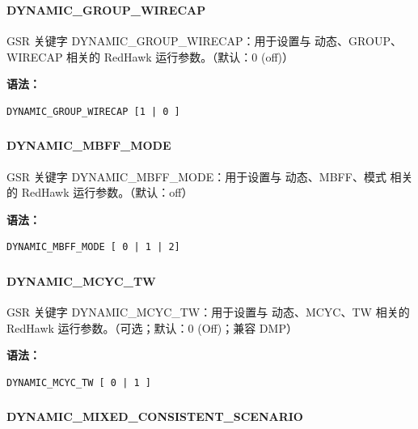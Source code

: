 \subsubsection{}
\paragraph*{DYNAMIC_GROUP_WIRECAP}

GSR 关键字 DYNAMIC_GROUP_WIRECAP：用于设置与 动态、GROUP、WIRECAP 相关的 RedHawk 运行参数。（默认：0 (off)）

\textbf{语法：}
\begin{lstlisting}
DYNAMIC_GROUP_WIRECAP [1 | 0 ]
\end{lstlisting}

\subsubsection{}
\paragraph*{DYNAMIC_MBFF_MODE}

GSR 关键字 DYNAMIC_MBFF_MODE：用于设置与 动态、MBFF、模式 相关的 RedHawk 运行参数。（默认：off）

\textbf{语法：}
\begin{lstlisting}
DYNAMIC_MBFF_MODE [ 0 | 1 | 2]
\end{lstlisting}

\subsubsection{}
\paragraph*{DYNAMIC_MCYC_TW}

GSR 关键字 DYNAMIC_MCYC_TW：用于设置与 动态、MCYC、TW 相关的 RedHawk 运行参数。（可选；默认：0 (Off)；兼容 DMP）

\textbf{语法：}
\begin{lstlisting}
DYNAMIC_MCYC_TW [ 0 | 1 ]
\end{lstlisting}

\subsubsection{}
\paragraph*{DYNAMIC_MIXED_CONSISTENT_SCENARIO}

